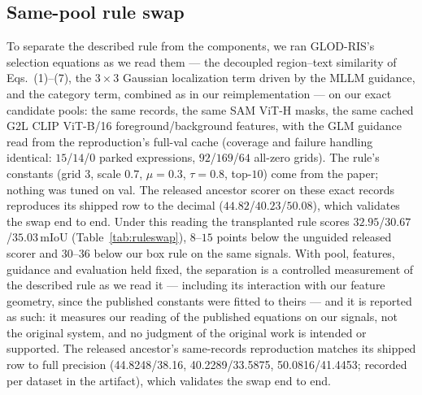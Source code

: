 \subsection{Same-pool rule swap}
\label{sec:ruleswap}
To separate the described rule from the components, we ran GLOD-RIS's
selection equations as we read them --- the decoupled region--text similarity
of Eqs.~(1)--(7), the $3{\times}3$ Gaussian localization term driven by the
MLLM guidance, and the category term, combined as in our reimplementation
--- on our exact candidate pools: the same records, the same SAM ViT-H masks,
the same cached G2L CLIP ViT-B/16 foreground/background features, with the
GLM guidance read from the reproduction's full-val cache (coverage and
failure handling identical: $15$/$14$/$0$ parked expressions,
$92$/$169$/$64$ all-zero grids). The rule's constants (grid $3$, scale $0.7$,
$\mu{=}0.3$, $\tau{=}0.8$, top-$10$) come from the paper; nothing was tuned
on val. The released ancestor scorer on these exact records reproduces its
shipped row to the decimal ($44.82$/$40.23$/$50.08$), which validates the
swap end to end. Under this reading the transplanted rule scores
$32.95$/$30.67$/$35.03$\,mIoU (Table~\ref{tab:ruleswap}), $8$--$15$ points
below the unguided released scorer and $30$--$36$ below our box rule on the
same signals. With pool, features, guidance and evaluation held fixed, the
separation is a controlled measurement of the described rule as we read it
--- including its interaction with our feature geometry, since the published
constants were fitted to theirs --- and it is reported as such: it measures
our reading of the published equations on our signals, not the original
system, and no judgment of the original work is intended or supported. The
released ancestor's same-records reproduction matches its shipped row to full
precision (44.8248/38.16, 40.2289/33.5875, 50.0816/41.4453; recorded per
dataset in the artifact), which validates the swap end to end.

\begin{table}[t]\centering\small
\caption{Same-pool rule swap (mIoU, official val splits): GLOD-RIS's own
selection rule run on our exact pools, features and guidance, against the
released HybridGL scorer and our box rule on the same records. Published
numbers are quoted as published elsewhere (Table~\ref{tab:sota}) and are not
part of this controlled table. oIoU follows the same ordering ($28.18$/$25.92$/$30.06$ for
their rule).}
\label{tab:ruleswap}

\end{table}
